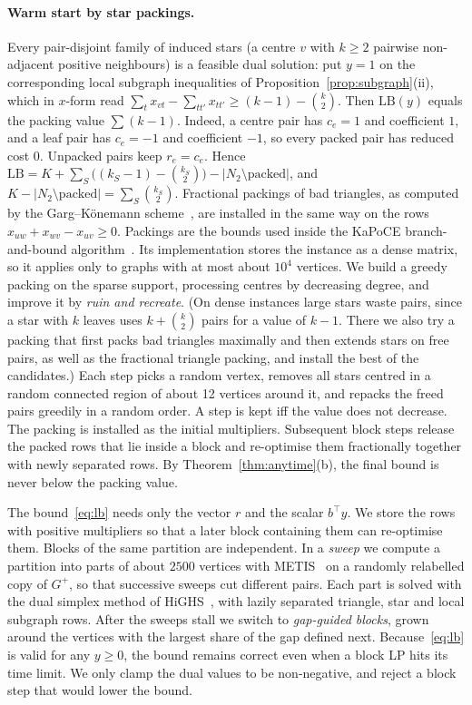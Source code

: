 \documentclass[11pt]{article}
\theoremstyle{definition}
\newcommand{\LB}{\mathrm{LB}}
\newcommand{\Nt}{N_{2}}
\begin{document}
\paragraph{Warm start by star packings.}  Every pair-disjoint family of
induced stars (a centre $v$ with $k\ge2$ pairwise non-adjacent positive
neighbours) is a feasible dual solution: put $y=1$ on the corresponding
local subgraph inequalities of Proposition~\ref{prop:subgraph}(ii), which in
$x$-form read $\sum_t x_{vt}-\sum_{tt'}x_{tt'}\ge (k-1)-\binom k2$.  Then
$\LB(y)$ equals the packing value $\sum(k-1)$.  Indeed, a centre pair has
$c_e=1$ and coefficient $1$, and a leaf pair has $c_e=-1$ and coefficient
$-1$, so every packed pair has reduced cost $0$.  Unpacked pairs keep
$r_e=c_e$.  Hence $\LB=K+\sum_S\big((k_S-1)-\binom{k_S}2\big)-|\Nt\setminus
\text{packed}|$, and $K-|\Nt\setminus\text{packed}|=\sum_S\binom{k_S}{2}$.
Fractional packings of bad triangles, as computed by the Garg--K\"onemann
scheme~\citep{GargK07,Fleischer00}, are installed in the same way on the
rows $x_{uw}+x_{wv}-x_{uv}\ge0$.
Packings are the bounds used inside the KaPoCE branch-and-bound
algorithm~\citep{BlasiusEtAl22sea}.  Its implementation stores the instance
as a dense matrix, so it applies only to graphs with at most about $10^4$
vertices.  We build a greedy packing on the sparse support, processing
centres by decreasing degree, and improve it by \emph{ruin and recreate}.
(On dense instances large stars waste pairs, since a star with $k$ leaves
uses $k+\binom k2$ pairs for a value of $k-1$.  There we also try a packing
that first packs bad triangles maximally and then extends stars on free
pairs, as well as the fractional triangle packing, and install the best of
the candidates.)
Each step picks a random vertex, removes all stars centred in a random
connected region of about 12 vertices around it, and repacks the freed
pairs greedily in a random order.  A step is kept iff the value does not
decrease.  The packing is installed as the initial multipliers.  Subsequent
block steps release the packed rows that lie inside a block and re-optimise
them fractionally together with newly separated rows.  By
Theorem~\ref{thm:anytime}(b), the final bound is never below the packing
value.

The bound~\eqref{eq:lb} needs only the vector $r$ and the scalar $b^\top y$.
We store the rows with positive multipliers so that a later block containing
them can re-optimise them.  Blocks of the same partition are independent.
In a \emph{sweep} we compute a partition into parts of about $2500$ vertices
with METIS~\citep{KarypisK98} on a randomly relabelled copy of $G^+$, so that
successive sweeps cut different pairs.  Each part is solved with the dual
simplex method of HiGHS~\citep{HuangfuH18}, with lazily separated triangle,
star and local subgraph rows.  After the sweeps stall we switch to
\emph{gap-guided blocks}, grown around the vertices with the largest share of
the gap defined next.  Because~\eqref{eq:lb} is valid for any $y\ge0$, the
bound remains correct even when a block LP hits its time limit.  We only
clamp the dual values to be non-negative, and reject a block step that would
lower the bound.
\end{document}
